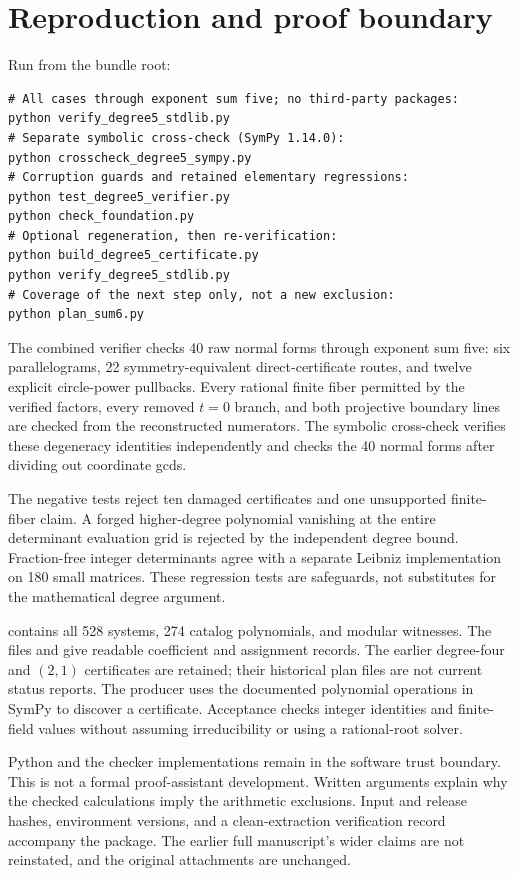\documentclass[11pt]{article}
\theoremstyle{definition}\newtheorem{definition}[theorem]{Definition}
\theoremstyle{remark}\newtheorem{remark}[theorem]{Remark}
\begin{document}
\section{Reproduction and proof boundary}
Run from the bundle root:
\begin{verbatim}
# All cases through exponent sum five; no third-party packages:
python verify_degree5_stdlib.py
# Separate symbolic cross-check (SymPy 1.14.0):
python crosscheck_degree5_sympy.py
# Corruption guards and retained elementary regressions:
python test_degree5_verifier.py
python check_foundation.py
# Optional regeneration, then re-verification:
python build_degree5_certificate.py
python verify_degree5_stdlib.py
# Coverage of the next step only, not a new exclusion:
python plan_sum6.py
\end{verbatim}
The combined verifier checks 40 raw normal forms through exponent sum five: six parallelograms, 22 symmetry-equivalent direct-certificate routes, and twelve explicit circle-power pullbacks. Every rational finite fiber permitted by the verified factors, every removed $t=0$ branch, and both projective boundary lines are checked from the reconstructed numerators. The symbolic cross-check verifies these degeneracy identities independently and checks the 40 normal forms after dividing out coordinate gcds.

The negative tests reject ten damaged certificates and one unsupported finite-fiber claim. A forged higher-degree polynomial vanishing at the entire determinant evaluation grid is rejected by the independent degree bound. Fraction-free integer determinants agree with a separate Leibniz implementation on 180 small matrices. These regression tests are safeguards, not substitutes for the mathematical degree argument.

 contains all 528 systems, 274 catalog polynomials, and modular witnesses. The files  and  give readable coefficient and assignment records. The earlier degree-four and $(2,1)$ certificates are retained; their historical plan files are not current status reports. The producer uses the documented polynomial operations in SymPy \cite{SymPy} to discover a certificate. Acceptance checks integer identities and finite-field values without assuming irreducibility or using a rational-root solver.

Python and the checker implementations remain in the software trust boundary. This is not a formal proof-assistant development. Written arguments explain why the checked calculations imply the arithmetic exclusions. Input and release hashes, environment versions, and a clean-extraction verification record accompany the package. The earlier full manuscript's wider claims are not reinstated, and the original attachments are unchanged.
\end{document}
